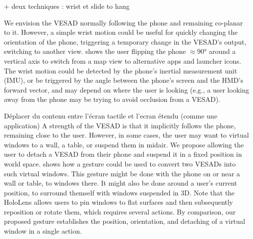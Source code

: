 + deux techniques : wrist et slide to hang

We envision the VESAD normally following the phone and remaining co-planar to it. However, a simple wrist motion could be useful for quickly changing the orientation of the phone, triggering a temporary change in the VESAD's output, switching to another view.  shows the user flipping the phone $\approx$\ang{90} around a vertical axis to switch from a map view to alternative apps and launcher icons. The wrist motion could be detected by the phone's inertial measurement unit (IMU), or be triggered by the angle between the phone's screen and the HMD's forward vector, and may depend on where the user is looking (e.g., a user looking away from the phone may be trying to avoid occlusion from a VESAD).


Déplacer du contenu entre l'écran tactile et l'ecran étendu (comme une application)
A strength of the VESAD is that it implicitly follows the phone, remaining close to the user. However, in some cases, the user may want to  virtual windows to a wall, a table, or suspend them in midair. We propose allowing the user to detach a VESAD from their phone and suspend it in a fixed position in world space.  shows how a  gesture could be used to convert two VESADs into such virtual windows. This gesture might be done with the phone on or near a wall or table, to  windows there. It might also be done around a user's current position, to surround themself with windows suspended in 3D. Note that the HoloLens allows users to pin windows to flat surfaces and then subsequently reposition or rotate them, which requires several actions. By comparison, our proposed  gesture establishes the position, orientation, and detaching of a virtual window in a single action.